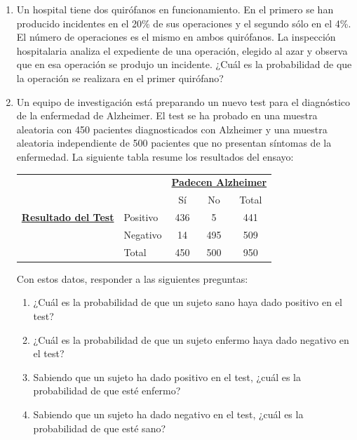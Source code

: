 \documentclass[10pt,a4paper]{article}\usepackage[]{graphicx}\usepackage[]{color}
\newcounter {cont01}
\begin{document}
\begin{enumerate}
    \item Un hospital tiene dos quirófanos en funcionamiento. En el primero se han producido incidentes en el 20\% de sus operaciones y el segundo sólo en el 4\%. El número de operaciones es el mismo en ambos quirófanos. La inspección hospitalaria analiza el expediente de una operación, elegido  al azar y observa que en esa operación se produjo un incidente. ¿Cuál es la probabilidad de que la operación se realizara en el primer quirófano?


    \item Un equipo de investigación está preparando un nuevo test para el diagnóstico de la enfermedad de Alzheimer. El test se ha probado en una muestra aleatoria con 450 pacientes diagnosticados con Alzheimer y una muestra aleatoria independiente de 500 pacientes que no presentan síntomas de la enfermedad. La siguiente tabla resume los resultados del ensayo:
        \begin{center}
            \begin{tabular}{llccc}
            &&\multicolumn{3}{c}{\underline{\bf Padecen Alzheimer}}\\

                                      &          & Sí  & No  & Total\\
            \hline
  \underline{\bf Resultado del  Test} & Positivo & 436 & 5   & 441  \\
                                      & Negativo & 14  & 495 & 509  \\
            \hline
                                      & Total    & 450 & 500 & 950  \\
            \hline
            \end{tabular}
        \end{center}
    Con estos datos, responder a las siguientes preguntas:
    \begin{enumerate}
        \item ¿Cuál es la probabilidad de que un sujeto sano haya dado positivo en el test?
        \item ¿Cuál es la probabilidad de que un sujeto enfermo haya dado negativo en el test?
        \item Sabiendo que un sujeto ha dado positivo en el test, ¿cuál es la probabilidad de que esté enfermo?
        \item  Sabiendo que un sujeto ha dado negativo en el test, ¿cuál es la probabilidad de que esté sano?
    \end{enumerate}


\end{enumerate}
\end{document}
